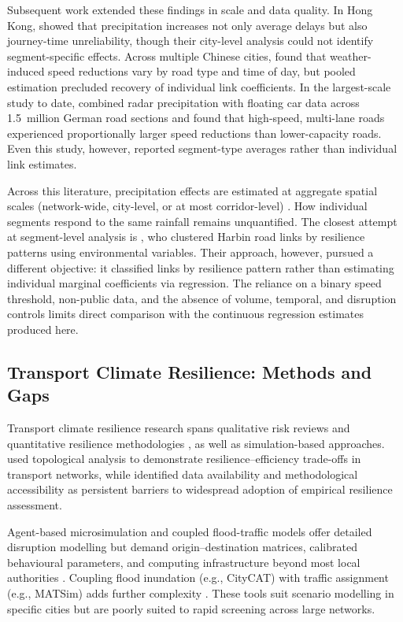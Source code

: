 \documentclass[review,authoryear]{elsarticle}
\begin{document}
Subsequent work extended these findings in scale and data quality. In Hong Kong, \citet{cai2016rainfall} showed that precipitation increases not only average delays but also journey-time unreliability, though their city-level analysis could not identify segment-specific effects. Across multiple Chinese cities, \citet{bi2022weather} found that weather-induced speed reductions vary by road type and time of day, but pooled estimation precluded recovery of individual link coefficients. In the largest-scale study to date, \citet{becker2026rainfall} combined radar precipitation with floating car data across 1.5~million German road sections and found that high-speed, multi-lane roads experienced proportionally larger speed reductions than lower-capacity roads. Even this study, however, reported segment-type averages rather than individual link estimates.

Across this literature, precipitation effects are estimated at aggregate spatial scales (network-wide, city-level, or at most corridor-level) \citep{koetse2009impact,hranac2006empirical,bi2022weather}. How individual segments respond to the same rainfall remains unquantified. The closest attempt at segment-level analysis is \citet{gao2024resilience}, who clustered Harbin road links by resilience patterns using environmental variables. Their approach, however, pursued a different objective: it classified links by resilience pattern rather than estimating individual marginal coefficients via regression. The reliance on a binary speed threshold, non-public data, and the absence of volume, temporal, and disruption controls limits direct comparison with the continuous regression estimates produced here.

\subsection{Transport Climate Resilience: Methods and Gaps}
\label{sec:lit:resilience}

Transport climate resilience research spans qualitative risk reviews \citep{wang2020climate} and quantitative resilience methodologies \citep{calvert2018methodology}, as well as simulation-based approaches. \citet{ganin2017resilience} used topological analysis to demonstrate resilience--efficiency trade-offs in transport networks, while \citet{bergantino2024assessing} identified data availability and methodological accessibility as persistent barriers to widespread adoption of empirical resilience assessment.

Agent-based microsimulation and coupled flood-traffic models offer detailed disruption modelling but demand origin--destination matrices, calibrated behavioural parameters, and computing infrastructure beyond most local authorities \citep{huang2022overview,pregnolato2017depth}. Coupling flood inundation (e.g., CityCAT) with traffic assignment (e.g., MATSim) adds further complexity \citep{pregnolato2017depth,he2026flood,farahmand2024integrating}. These tools suit scenario modelling in specific cities but are poorly suited to rapid screening across large networks.
\end{document}
